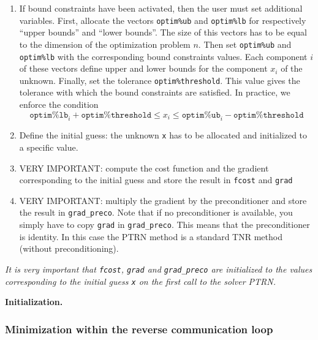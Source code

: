 \documentclass[a4paper,twoside,final,onecolumn,11pt,openright]{article}
\begin{document}
\begin{enumerate}
\item If bound constraints have been activated, then the user must set additional variables. First, allocate the vectors \texttt{optim\%ub} and \texttt{optim\%lb} for respectively ``upper bounds'' and ``lower bounds''. The size of this vectors has to be equal to the dimension of the optimization problem $n$. Then set \texttt{optim\%ub} and \texttt{optim\%lb} with the corresponding bound constraints values. Each component $i$ of these vectors define upper and lower bounds for the component $x_i$ of the unknown. Finally, set the tolerance \texttt{optim\%threshold}. This value gives the tolerance with which the bound constraints are satisfied. In practice, we enforce the condition
\begin{equation}
 \texttt{optim\%lb}_i + \texttt{optim\%threshold} \leq x_i \leq \texttt{optim\%ub}_i - \texttt{optim\%threshold}
\end{equation}
\item Define the initial guess: the unknown \texttt{x} has to be allocated and initialized to a specific value. 
\item VERY IMPORTANT: compute the cost function and the gradient corresponding to the initial guess and store the result in \texttt{fcost} and \texttt{grad}
\item VERY IMPORTANT: multiply the gradient by the preconditioner and store the result in \texttt{grad\_preco}. Note that if no preconditioner is available, you simply have to copy \texttt{grad} in \texttt{grad\_preco}. This means that the preconditioner is identity. In this case the PTRN method is a standard TNR method (without preconditioning).  
\end{enumerate}
\textit{
It is very important that \texttt{fcost}, \texttt{grad} and \texttt{grad\_preco} are initialized to the values corresponding to the initial guess \texttt{x} on the first call to the solver PTRN.}

\framebox{
\small
 
}
\normalsize
\begin{center}
\textbf{Initialization.} 
\end{center}

\subsubsection{Minimization within the reverse communication loop}
\end{document}

